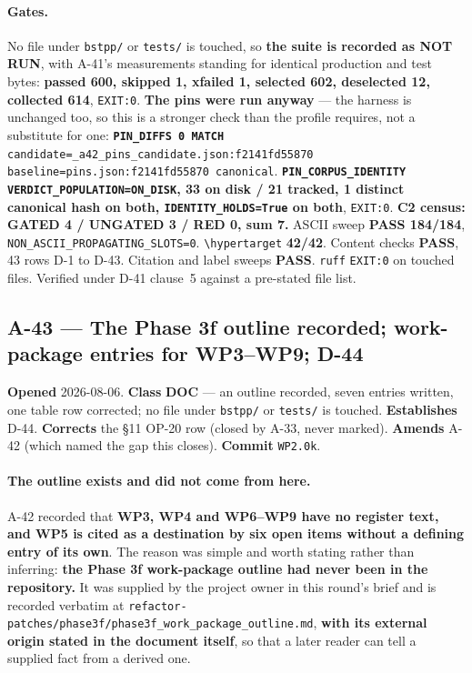 \documentclass[
  10pt,
]{article}
\begin{document}
\paragraph{Gates.}
No file under \texttt{bstpp/} or \texttt{tests/} is touched, so \textbf{the suite is recorded as NOT RUN}, with A-41's measurements standing for identical production and test bytes: \textbf{passed 600, skipped 1, xfailed 1, selected 602, deselected 12, collected 614}, \texttt{EXIT:0}. \textbf{The pins were run anyway} --- the harness is unchanged too, so this is a stronger check than the profile requires, not a substitute for one: \textbf{\texttt{PIN\_DIFFS 0 MATCH}} \texttt{candidate=\allowbreak{}\_a42\_pins\_candidate.json:\allowbreak{}f2141fd55870 baseline=\allowbreak{}pins.json:\allowbreak{}f2141fd55870 canonical}. \textbf{\texttt{PIN\_CORPUS\_IDENTITY} \texttt{VERDICT\_POPULATION=ON\_DISK}, 33 on disk / 21 tracked, 1 distinct canonical hash on both, \texttt{IDENTITY\_HOLDS=True} on both}, \texttt{EXIT:0}. \textbf{C2 census: GATED 4 / UNGATED 3 / RED 0, sum 7.} ASCII sweep \textbf{PASS 184/184}, \texttt{NON\_ASCII\_PROPAGATING\_SLOTS=0}. \texttt{\textbackslash hypertarget} \textbf{42/42}. Content checks \textbf{PASS}, 43 rows D-1 to D-43. Citation and label sweeps \textbf{PASS}. \texttt{ruff} \texttt{EXIT:0} on touched files. Verified under D-41 clause~5 against a pre-stated file list.

\hypertarget{a-43}{%
\subsection{A-43 --- The Phase 3f outline recorded; work-package entries for WP3--WP9; D-44}\label{a-43}}

\textbf{Opened} 2026-08-06. \textbf{Class} \textbf{DOC} --- an outline recorded, seven entries written, one table row corrected; no file under \texttt{bstpp/} or \texttt{tests/} is touched. \textbf{Establishes} D-44. \textbf{Corrects} the \S11 OP-20 row (closed by A-33, never marked). \textbf{Amends} A-42 (which named the gap this closes). \textbf{Commit} \texttt{WP2.0k}.

\paragraph{The outline exists and did not come from here.}
A-42 recorded that \textbf{WP3, WP4 and WP6--WP9 have no register text, and WP5 is cited as a destination by six open items without a defining entry of its own}. The reason was simple and worth stating rather than inferring: \textbf{the Phase 3f work-package outline had never been in the repository.} It was supplied by the project owner in this round's brief and is recorded verbatim at \texttt{refactor-patches/\allowbreak{}phase3f/\allowbreak{}phase3f\_work\_package\_outline.md}, \textbf{with its external origin stated in the document itself}, so that a later reader can tell a supplied fact from a derived one.
\end{document}
